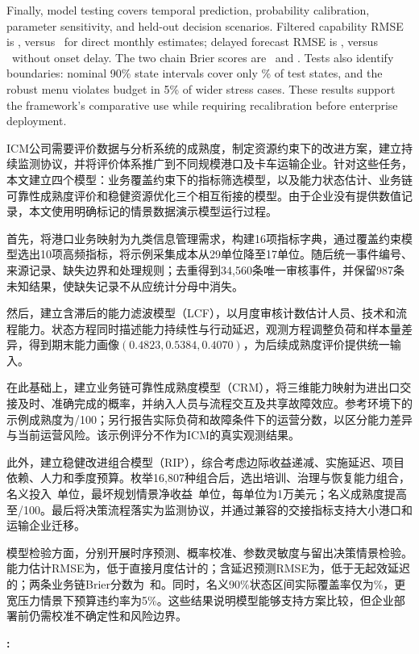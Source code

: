 {Finally, model testing covers temporal prediction, probability calibration, parameter sensitivity, and held-out decision scenarios. Filtered capability RMSE is \StateRMSE, versus \RawRMSE\ for direct monthly estimates; delayed forecast RMSE is \ForecastRMSE, versus \ZeroRMSE\ without onset delay. The two chain Brier scores are \BrierImport\ and \BrierExport. Tests also identify boundaries: nominal 90\% state intervals cover only \Coverage\% of test states, and the robust menu violates budget in 5\% of wider stress cases. These results support the framework's comparative use while requiring recalibration before enterprise deployment.
}{
ICM公司需要评价数据与分析系统的成熟度，制定资源约束下的改进方案，建立持续监测协议，并将评价体系推广到不同规模港口及卡车运输企业。针对这些任务，本文建立四个模型：业务覆盖约束下的指标筛选模型，以及能力状态估计、业务链可靠性成熟度评价和稳健资源优化三个相互衔接的模型。由于企业没有提供数值记录，本文使用明确标记的情景数据演示模型运行过程。

首先，将港口业务映射为九类信息管理需求，构建16项指标字典，通过覆盖约束模型选出10项高频指标，将示例采集成本从29单位降至17单位。随后统一事件编号、来源记录、缺失边界和处理规则；去重得到34,560条唯一审核事件，并保留987条未知结果，使缺失记录不从应统计分母中消失。

然后，建立含滞后的能力滤波模型（LCF），以月度审核计数估计人员、技术和流程能力。状态方程同时描述能力持续性与行动延迟，观测方程调整负荷和样本量差异，得到期末能力画像$(0.4823,0.5384,0.4070)$，为后续成熟度评价提供统一输入。

在此基础上，建立业务链可靠性成熟度模型（CRM），将三维能力映射为进出口交接及时、准确完成的概率，并纳入人员与流程交互及共享故障效应。参考环境下的示例成熟度为\BaseMaturity/100；另行报告实际负荷和故障条件下的运营分数，以区分能力差异与当前运营风险。该示例评分不作为ICM的真实观测结果。

此外，建立稳健改进组合模型（RIP），综合考虑边际收益递减、实施延迟、项目依赖、人力和季度预算。枚举16,807种组合后，选出培训、治理与恢复能力组合，名义投入\PlanCost\ 单位，最坏规划情景净收益\WorstNet\ 单位，每单位为1万美元；名义成熟度提高至\FinalMaturity/100。最后将决策流程落实为监测协议，并通过兼容的交接指标支持大小港口和运输企业迁移。

模型检验方面，分别开展时序预测、概率校准、参数灵敏度与留出决策情景检验。能力估计RMSE为\StateRMSE，低于直接月度估计的\RawRMSE；含延迟预测RMSE为\ForecastRMSE，低于无起效延迟的\ZeroRMSE；两条业务链Brier分数为\BrierImport\ 和\BrierExport。同时，名义90\%状态区间实际覆盖率仅为\Coverage\%，更宽压力情景下预算违约率为5\%。这些结果说明模型能够支持方案比较，但企业部署前仍需校准不确定性和风险边界。
}
\par\smallskip\noindent\textbf{:} 

